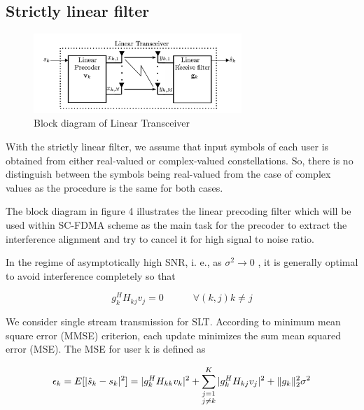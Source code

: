 \documentclass[12pt,a4paper,notitlepage,twoside,headsepline]{scrartcl}
\begin{document}
\subsection{Strictly linear filter}

\begin{figure}[!ht]
\begin{center}
\includegraphics[width=0.7\textwidth]{figures/sl_system_model.png}
\end{center}
\caption{Block diagram of Linear Transceiver} 
\label{fig:example}
\end{figure}

With the strictly linear filter, we assume that input symbols of each user is obtained from either real-valued or complex-valued constellations. So, there is no distinguish between the symbols being real-valued from the case of complex values as the procedure is the same for both cases. 

The block diagram in figure 4 illustrates the linear precoding filter which will be used within SC-FDMA scheme as the main task for the precoder to extract the interference alignment and try to cancel it for high signal to noise ratio.

In the regime of asymptotically high SNR, i. e., as $\sigma^2 \rightarrow 0$ ,
it is generally optimal to avoid interference completely so that

\begin{equation}
	g_{k}^{H} H_{kj} v_j = 0 \quad \quad \quad \forall (k,j) k \neq j
\end{equation}


We consider single stream transmission for SLT. According to minimum mean square error (MMSE) criterion, each
update minimizes the sum mean squared error (MSE). The MSE for user k is defined as

\begin{equation}
	\epsilon_k =  E[ |\hat{s}_k - s_k |^2 ] \\
	 = |g_{k}^{H} H_{kk} v_k|^2 + \sum_{\substack{j=1 \\ j \neq k}}^{K}{|g_{k}^{H} H_{kj} v_j|^2} + \Vert{g_k}\Vert_2^2 \sigma^2
\end{equation}
\end{document}
